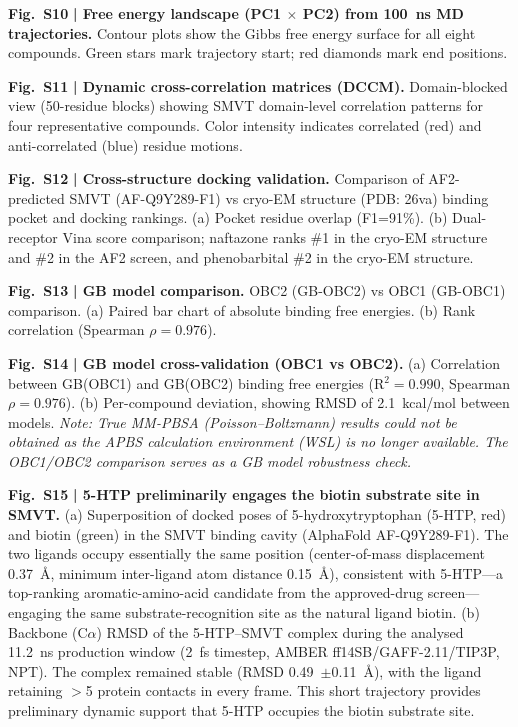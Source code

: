 \documentclass[pdflatex,sn-nature]{sn-jnl}
\begin{document}
\noindent\textbf{Fig.~S10} \textbf{| Free energy landscape (PC1 $\times$ PC2) from 100~ns MD trajectories.} Contour plots show the Gibbs free energy surface for all eight compounds. Green stars mark trajectory start; red diamonds mark end positions.

\noindent\textbf{Fig.~S11} \textbf{| Dynamic cross-correlation matrices (DCCM).} Domain-blocked view (50-residue blocks) showing SMVT domain-level correlation patterns for four representative compounds. Color intensity indicates correlated (red) and anti-correlated (blue) residue motions.

\noindent\textbf{Fig.~S12} \textbf{| Cross-structure docking validation.} Comparison of AF2-predicted SMVT (AF-Q9Y289-F1) vs cryo-EM structure (PDB: 26va) binding pocket and docking rankings. (a) Pocket residue overlap (F1=91\%). (b) Dual-receptor Vina score comparison; naftazone ranks \#1 in the cryo-EM structure and \#2 in the AF2 screen, and phenobarbital \#2 in the cryo-EM structure.

\noindent\textbf{Fig.~S13} \textbf{| GB model comparison.} OBC2 (GB-OBC2) vs OBC1 (GB-OBC1) comparison. (a) Paired bar chart of absolute binding free energies. (b) Rank correlation (Spearman $\rho = 0.976$).

\noindent\textbf{Fig.~S14} \textbf{| GB model cross-validation (OBC1 vs OBC2).} (a) Correlation between GB(OBC1) and GB(OBC2) binding free energies (R$^2 = 0.990$, Spearman $\rho = 0.976$). (b) Per-compound deviation, showing RMSD of 2.1~kcal/mol between models. \textit{Note: True MM-PBSA (Poisson--Boltzmann) results could not be obtained as the APBS calculation environment (WSL) is no longer available. The OBC1/OBC2 comparison serves as a GB model robustness check.}

\noindent\textbf{Fig.~S15} \textbf{| 5-HTP preliminarily engages the biotin substrate site in SMVT.} (a) Superposition of docked poses of 5-hydroxytryptophan (5-HTP, red) and biotin (green) in the SMVT binding cavity (AlphaFold AF-Q9Y289-F1). The two ligands occupy essentially the same position (center-of-mass displacement 0.37~\AA{}, minimum inter-ligand atom distance 0.15~\AA{}), consistent with 5-HTP---a top-ranking aromatic-amino-acid candidate from the approved-drug screen---engaging the same substrate-recognition site as the natural ligand biotin. (b) Backbone (C$\alpha$) RMSD of the 5-HTP--SMVT complex during the analysed 11.2~ns production window (2~fs timestep, AMBER ff14SB/GAFF-2.11/TIP3P, NPT). The complex remained stable (RMSD 0.49~$\pm$0.11~\AA{}), with the ligand retaining $>$5 protein contacts in every frame. This short trajectory provides preliminary dynamic support that 5-HTP occupies the biotin substrate site.
\end{document}
